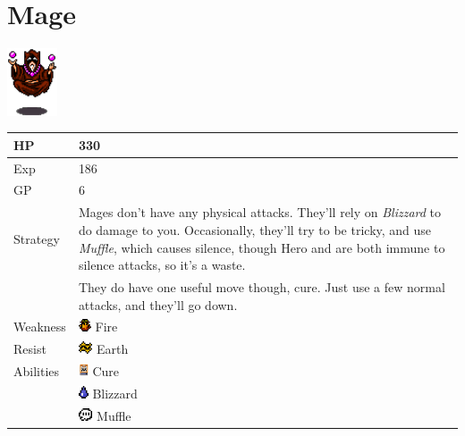\section{Mage}
\label{monster:mage}

\includegraphics[height=2cm,keepaspectratio]{./resources/monster/mage}

\begin{longtable}{ l p{9cm} }
	HP
	& 330
\\ \hline
	Exp
	& 186
\\ \hline
	GP
	& 6
\\ \hline
	Strategy
	& Mages don't have any physical attacks. They'll rely on \textit{Blizzard} to do damage to you. Occasionally, they'll try to be tricky, and use \textit{Muffle}, which causes silence, though Hero and \nameref{char:phoebe} are both immune to silence attacks, so it's a waste. \\
	& They do have one useful move though, cure. Just use a few normal attacks, and they'll go down.
\\ \hline
	Weakness
	& \includegraphics[height=1em,keepaspectratio]{./resources/effects/fire} Fire
\\ \hline
	Resist
	& \includegraphics[height=1em,keepaspectratio]{./resources/effects/earth} Earth
\\ \hline
	Abilities
	& \includegraphics[height=1em,keepaspectratio]{./resources/spells/cure} Cure \\
	& \includegraphics[height=1em,keepaspectratio]{./resources/effects/water} Blizzard \\
	& \includegraphics[height=1em,keepaspectratio]{./resources/effects/silence} Muffle
\end{longtable}
